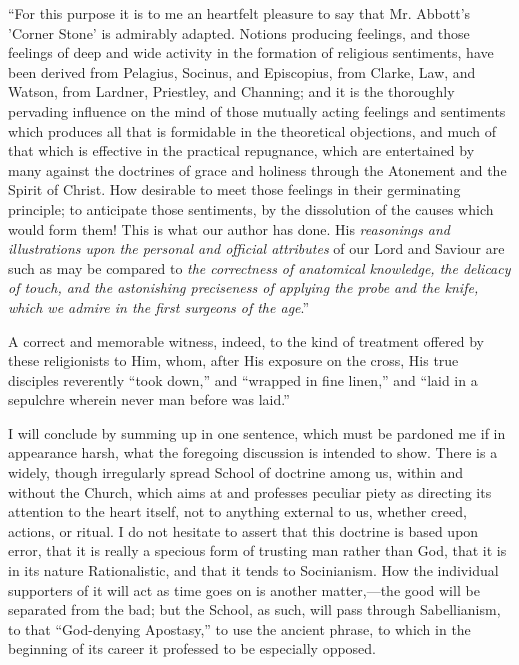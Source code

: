 ``For this purpose it is to me an
heartfelt pleasure to say that Mr. Abbott's 'Corner Stone' is
admirably adapted. Notions producing feelings, and those feelings of
deep and wide activity in the formation of religious sentiments, have
been derived from Pelagius, Socinus, and Episcopius, from Clarke, Law,
and Watson, from Lardner, Priestley, and Channing; and it is the
thoroughly pervading influence on the mind of those mutually acting
feelings and sentiments which produces all that is formidable in the
theoretical objections, and much of that which is effective in the
practical repugnance, which are entertained by many against the
doctrines of grace and holiness through the Atonement and the Spirit
of Christ. How desirable to meet those feelings in their germinating
principle; to anticipate those sentiments, by the dissolution of the
causes which would form them! This is what our author has done.
His \emph{reasonings and illustrations upon the
personal and official attributes} of our Lord and Saviour are such
as may be compared to \emph{the correctness of anatomical knowledge, the
delicacy of touch, and the astonishing preciseness of applying the
probe and the knife, which we admire in the first surgeons of the age}.''

A correct and memorable witness, indeed, to the
kind of treatment offered by these religionists to Him, whom, after
His exposure on the cross, His true disciples reverently ``took
down,'' and ``wrapped in fine linen,'' and ``laid in a sepulchre
wherein never man before was laid.''

I will conclude by summing up in one sentence,
which must be pardoned me if in appearance harsh, what the foregoing
discussion is intended to show. There is a widely, though irregularly
spread School of doctrine among us, within and without the Church,
which aims at and professes peculiar piety as directing its attention
to the heart itself, not to anything external to us, whether creed,
actions, or ritual. I do not hesitate to assert that this doctrine is
based upon error, that it is really a specious form of trusting man
rather than God, that it is in its nature Rationalistic, and that it
tends to Socinianism. How the individual supporters of it will act as
time goes on is another matter,—the good will be separated from the
bad; but the School, as such, will pass through Sabellianism, to that ``God-denying Apostasy,'' to use the ancient phrase, to which in the
beginning of its career it professed to be especially opposed.


